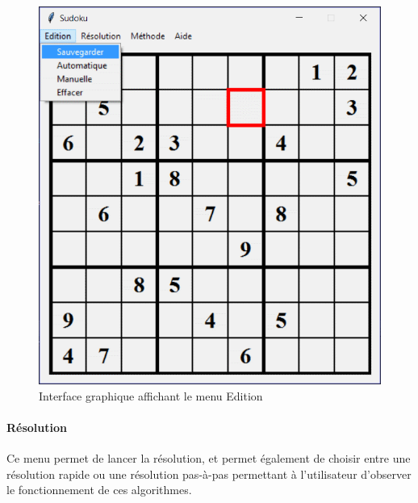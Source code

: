 \documentclass[12pt,a4paper]{report}
\begin{document}
\begin{figure}[!h]
 \center
 \includegraphics[scale=0.55]{../pictures/Sudoku_edition}
 \caption{Interface graphique affichant le menu Edition}
\end{figure}
\newpage
\paragraph{Résolution}Ce menu permet de lancer la résolution, et permet également de choisir entre une résolution rapide ou une résolution pas-à-pas permettant à l'utilisateur d'observer le fonctionnement de ces algorithmes.
\end{document}
